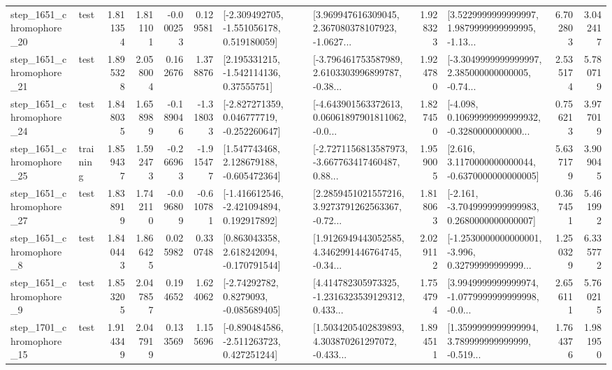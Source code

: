 \begin{tabular}{llrrrrllrlrr}
 step\_1651\_chromophore\_20 &      test &      1.811354 &    1.811101 &     -0.000253 &  0.129581 &   [-2.309492705, -1.551056178, 0.519180059] &  [3.969947616309045, 2.367080378107923, -1.0627... &       1.928323 &  [3.5229999999999997, 1.9879999999999995, -1.13... &            6.702803 &          3.042417 \\
 step\_1651\_chromophore\_21 &      test &      1.895328 &    2.058004 &      0.162676 &  1.378876 &     [2.195331215, -1.542114136, 0.37555751] &  [-3.796461753587989, 2.6103303996899787, -0.38... &       1.924780 &  [-3.3049999999999997, 2.385000000000005, -0.74... &            2.535174 &          5.780719 \\
 step\_1651\_chromophore\_24 &      test &      1.848035 &    1.658989 &     -0.189046 & -1.318033 &   [-2.827271359, 0.046777719, -0.252260647] &  [-4.643901563372613, 0.06061897901811062, -0.0... &       1.827450 &  [-4.098, 0.10699999999999932, -0.3280000000000... &            0.756213 &          3.977019 \\
 step\_1651\_chromophore\_25 &  training &      1.859437 &    1.592473 &     -0.266963 & -1.915477 &    [1.547743468, 2.128679188, -0.605472364] &  [-2.7271156813587973, -3.667763417460487, 0.88... &       1.959005 &   [2.616, 3.1170000000000044, -0.6370000000000005] &            5.637179 &          3.909045 \\
 step\_1651\_chromophore\_27 &      test &      1.838919 &    1.742110 &     -0.096809 & -0.610781 &   [-1.416612546, -2.421094894, 0.192917892] &  [2.2859451021557216, 3.9273791262563367, -0.72... &       1.818063 &  [-2.161, -3.7049999999999983, 0.2680000000000007] &            0.367451 &          5.461992 \\
  step\_1651\_chromophore\_8 &      test &      1.840443 &    1.866425 &      0.025982 &  0.330748 &    [0.863043358, 2.618242094, -0.170791544] &  [1.9126949443052585, 4.3462991446764745, -0.34... &       2.029112 &  [-1.2530000000000001, -3.996, 0.32799999999999... &            1.250329 &          6.335772 \\
  step\_1651\_chromophore\_9 &      test &      1.853205 &    2.047857 &      0.194652 &  1.624062 &      [-2.74292782, 0.8279093, -0.085689405] &  [4.414782305973325, -1.2316323539129312, 0.433... &       1.754794 &  [3.9949999999999974, -1.0779999999999998, -0.0... &            2.656111 &          5.760215 \\
 step\_1701\_chromophore\_15 &      test &      1.914349 &    2.047919 &      0.133569 &  1.155696 &   [-0.890484586, -2.511263723, 0.427251244] &  [1.5034205402839893, 4.303870261297072, -0.433... &       1.894511 &  [1.3599999999999994, 3.789999999999999, -0.519... &            1.764376 &          1.981950 \\

\end{tabular}
